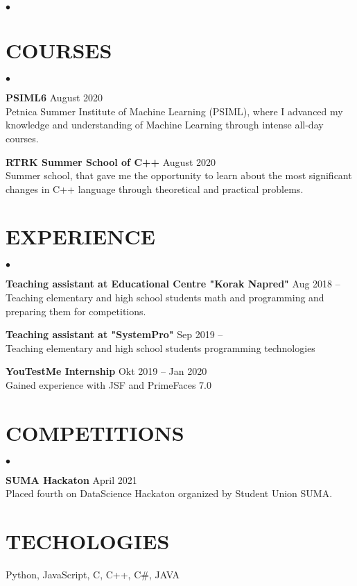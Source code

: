 \documentclass[margin,center]{res}
\newenvironment{list2}{
  \begin{list}{$\bullet$}{%
      \setlength{\itemsep}{0in}
      \setlength{\parsep}{0in} \setlength{\parskip}{0in}
      \setlength{\topsep}{0in} \setlength{\partopsep}{0in}
      \setlength{\leftmargin}{0.2in}}}{\end{list}}
\begin{document}
\begin{resume}
\begin{list2}
\end{list2}

\section{COURSES}
\begin{list2}
  \item {\bf PSIML6} \hfill August 2020\\
    Petnica Summer Institute of Machine Learning (PSIML), where I
    advanced my knowledge and understanding of Machine Learning
    through intense all-day courses.

  \item {\bf RTRK Summer School of C++} \hfill August 2020\\
    Summer school, that gave me the opportunity to learn about the
    most significant changes in C++ language through theoretical and
    practical problems.

\end{list2}


\section{EXPERIENCE} 
\begin{list2}
  \item{\bf Teaching assistant at Educational Centre "Korak Napred"}  \hfill Aug 2018 --\\
    Teaching elementary and high school students math and programming and preparing them for competitions.
  \item{\bf Teaching assistant at "SystemPro"}  \hfill Sep 2019 --\\
    Teaching elementary and high school students programming technologies 
  \item{\bf YouTestMe Internship}  \hfill Okt 2019 -- Jan 2020\\
    Gained experience with JSF and PrimeFaces 7.0
\end{list2}

\section{COMPETITIONS}
\begin{list2}
\item{\bf SUMA Hackaton} \hfill April 2021\\
  Placed fourth on DataScience Hackaton organized by Student Union SUMA.
\end{list2}

\section{TECHOLOGIES}  
Python, JavaScript, C, C++, C\#, JAVA



\end{resume}
\end{document}
